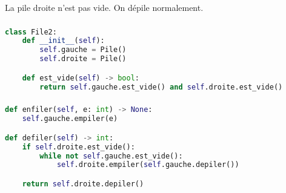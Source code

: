 \documentclass[svgnames,11pt]{beamer}
\begin{document}
\begin{frame}
    \begin{center}
    \end{center}
    \begin{center}
        La pile droite n'est pas vide. On dépile normalement.
    \end{center}
\end{frame}
\begin{frame}[fragile]
    \frametitle{}

    \begin{lstlisting}[language=Python , basicstyle=\ttfamily\small, xleftmargin=2em, xrightmargin=2em]
class File2:
    def __init__(self):
        self.gauche = Pile()
        self.droite = Pile()

    def est_vide(self) -> bool:
        return self.gauche.est_vide() and self.droite.est_vide()        
\end{lstlisting}

\end{frame}
\begin{frame}[fragile]
    \frametitle{}

    \begin{lstlisting}[language=Python , basicstyle=\ttfamily\small, xleftmargin=2em, xrightmargin=2em]
def enfiler(self, e: int) -> None:
    self.gauche.empiler(e)

def defiler(self) -> int:
    if self.droite.est_vide():
        while not self.gauche.est_vide():
            self.droite.empiler(self.gauche.depiler())

    return self.droite.depiler()       
\end{lstlisting}

\end{frame}
\end{document}
